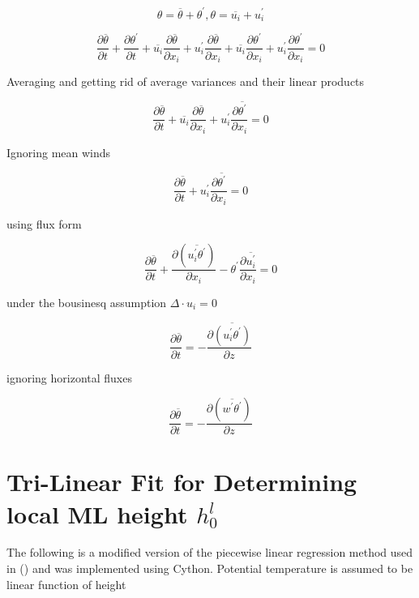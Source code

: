 \begin{equation}
\theta = \overline{\theta} + \theta^{'}, \theta = \overline{u_{i}} + u_{i}^{'} 
\end{equation}

\begin{equation}
\frac{\partial \overline{\theta}}{\partial t} + \frac{\partial \theta^{'}}{\partial t} + \overline{u_{i}}\frac{\partial \overline{\theta}}{\partial x_{i}} + u_{i}^{'}\frac{\partial \overline{\theta}}{\partial x_{i}} + \overline{u_{i}}\frac{\partial \theta^{'}}{\partial x_{i}} + u_{i}^{'}\frac{\partial \theta^{'}}{\partial x_{i}} = 0
\end{equation}

Averaging and getting rid of average variances and their linear products

\begin{equation}
\frac{\partial \overline{\theta}}{\partial t} + \overline{u_{i}}\frac{\partial \overline{\theta}}{\partial x_{i}} + u_{i}^{'}\frac{\partial \overline{\theta^{'}}}{\partial x_{i}} = 0
\end{equation}

Ignoring mean winds

\begin{equation}
\frac{\partial \overline{\theta}}{\partial t} + u_{i}^{'}\frac{\partial \overline{\theta^{'}}}{\partial x_{i}} = 0
\end{equation}

using flux form

\begin{equation}
\frac{\partial \overline{\theta}}{\partial t} + \frac{\partial(\overline{u_{i}^{'}\theta^{'}})}{\partial x_{i}} - \theta^{'}\frac{\partial \overline{u_{i}^{'}}}{\partial x_{i}}= 0
\end{equation}

under the bousinesq assumption $\Delta \cdot u_{i} = 0$

\begin{equation}
\frac{\partial \overline{\theta}}{\partial t} = -\frac{\partial\overline{(u_{i}^{'}\theta^{'})}}{\partial z}
\end{equation}

ignoring horizontal fluxes

\begin{equation}
\label{eq:warming1}
\frac{\partial \overline{\theta}}{\partial t} = -\frac{\partial(\overline{w^{'}\theta^{'}})}{\partial z}
\end{equation}

\section{Tri-Linear Fit for Determining local \acs{ML} height $h^{l}_{0}$}
\label{sec:trilin}
The following is a modified version of the piecewise linear regression method used in \citeauthor{Vieth} (\citeyear{Vieth}) and was implemented using Cython.  Potential temperature is assumed to be linear function of height 

